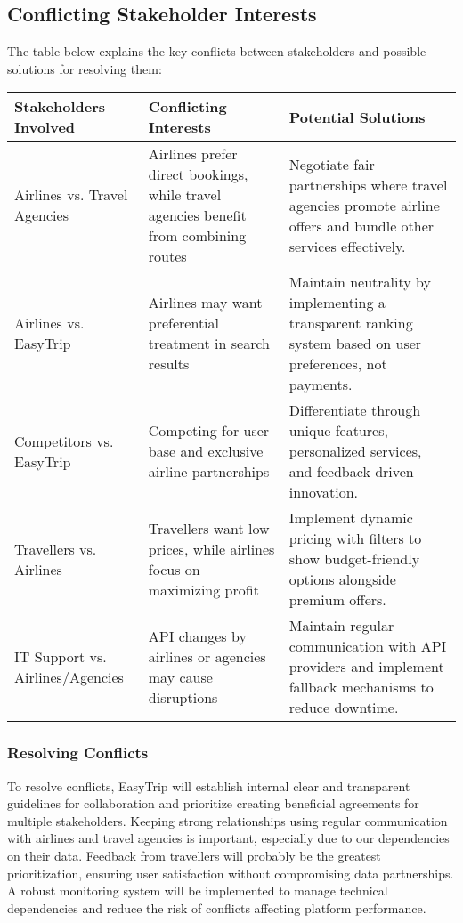 \subsection{Conflicting Stakeholder Interests}
The table below explains the key conflicts between stakeholders and possible solutions for resolving them:

\begin{longtable}{|p{4cm}|p{5cm}|p{4.5cm}|}
    \hline
    \rowcolor{headergray}
    \textbf{Stakeholders Involved} & \textbf{Conflicting Interests} & \textbf{Potential Solutions} \\ \hline
    Airlines vs. Travel Agencies & Airlines prefer direct bookings, while travel agencies benefit from combining routes & Negotiate fair partnerships where travel agencies promote airline offers and bundle other services effectively. \\ \hline
    Airlines vs. EasyTrip & Airlines may want preferential treatment in search results & Maintain neutrality by implementing a transparent ranking system based on user preferences, not payments. \\ \hline
    Competitors vs. EasyTrip & Competing for user base and exclusive airline partnerships & Differentiate through unique features, personalized services, and feedback-driven innovation. \\ \hline
    Travellers vs. Airlines & Travellers want low prices, while airlines focus on maximizing profit & Implement dynamic pricing with filters to show budget-friendly options alongside premium offers. \\ \hline
    IT Support vs. Airlines/Agencies & API changes by airlines or agencies may cause disruptions & Maintain regular communication with API providers and implement fallback mechanisms to reduce downtime. \\ \hline
\end{longtable}

\subsubsection{Resolving Conflicts}
To resolve conflicts, EasyTrip will establish internal clear and transparent guidelines for collaboration and prioritize creating beneficial agreements for multiple stakeholders. Keeping strong relationships using regular communication with airlines and travel agencies is important, especially due to our dependencies on their data. Feedback from travellers will probably be the greatest prioritization, ensuring user satisfaction without compromising data partnerships. A robust monitoring system will be implemented to manage technical dependencies and reduce the risk of conflicts affecting platform performance.

